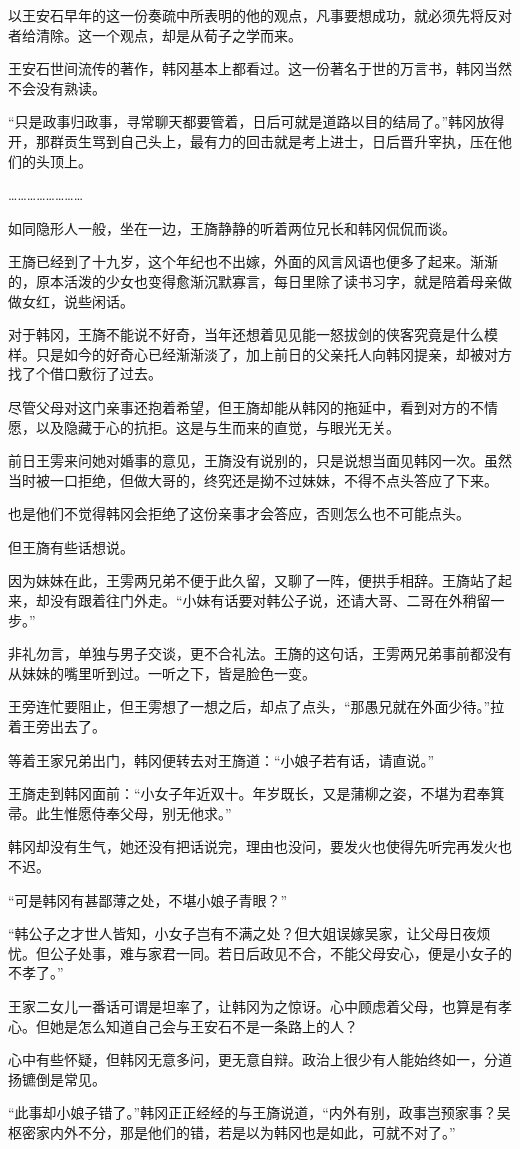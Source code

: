 以王安石早年的这一份奏疏中所表明的他的观点，凡事要想成功，就必须先将反对者给清除。这一个观点，却是从荀子之学而来。

王安石世间流传的著作，韩冈基本上都看过。这一份著名于世的万言书，韩冈当然不会没有熟读。

“只是政事归政事，寻常聊天都要管着，日后可就是道路以目的结局了。”韩冈放得开，那群贡生骂到自己头上，最有力的回击就是考上进士，日后晋升宰执，压在他们的头顶上。

……………………

如同隐形人一般，坐在一边，王旖静静的听着两位兄长和韩冈侃侃而谈。

王旖已经到了十九岁，这个年纪也不出嫁，外面的风言风语也便多了起来。渐渐的，原本活泼的少女也变得愈渐沉默寡言，每日里除了读书习字，就是陪着母亲做做女红，说些闲话。

对于韩冈，王旖不能说不好奇，当年还想着见见能一怒拔剑的侠客究竟是什么模样。只是如今的好奇心已经渐渐淡了，加上前日的父亲托人向韩冈提亲，却被对方找了个借口敷衍了过去。

尽管父母对这门亲事还抱着希望，但王旖却能从韩冈的拖延中，看到对方的不情愿，以及隐藏于心的抗拒。这是与生而来的直觉，与眼光无关。

前日王雱来问她对婚事的意见，王旖没有说别的，只是说想当面见韩冈一次。虽然当时被一口拒绝，但做大哥的，终究还是拗不过妹妹，不得不点头答应了下来。

也是他们不觉得韩冈会拒绝了这份亲事才会答应，否则怎么也不可能点头。

但王旖有些话想说。

因为妹妹在此，王雱两兄弟不便于此久留，又聊了一阵，便拱手相辞。王旖站了起来，却没有跟着往门外走。“小妹有话要对韩公子说，还请大哥、二哥在外稍留一步。”

非礼勿言，单独与男子交谈，更不合礼法。王旖的这句话，王雱两兄弟事前都没有从妹妹的嘴里听到过。一听之下，皆是脸色一变。

王旁连忙要阻止，但王雱想了一想之后，却点了点头，“那愚兄就在外面少待。”拉着王旁出去了。

等着王家兄弟出门，韩冈便转去对王旖道：“小娘子若有话，请直说。”

王旖走到韩冈面前：“小女子年近双十。年岁既长，又是蒲柳之姿，不堪为君奉箕帚。此生惟愿侍奉父母，别无他求。”

韩冈却没有生气，她还没有把话说完，理由也没问，要发火也使得先听完再发火也不迟。

“可是韩冈有甚鄙薄之处，不堪小娘子青眼？”

“韩公子之才世人皆知，小女子岂有不满之处？但大姐误嫁吴家，让父母日夜烦忧。但公子处事，难与家君一同。若日后政见不合，不能父母安心，便是小女子的不孝了。”

王家二女儿一番话可谓是坦率了，让韩冈为之惊讶。心中顾虑着父母，也算是有孝心。但她是怎么知道自己会与王安石不是一条路上的人？

心中有些怀疑，但韩冈无意多问，更无意自辩。政治上很少有人能始终如一，分道扬镳倒是常见。

“此事却小娘子错了。”韩冈正正经经的与王旖说道，“内外有别，政事岂预家事？吴枢密家内外不分，那是他们的错，若是以为韩冈也是如此，可就不对了。”


